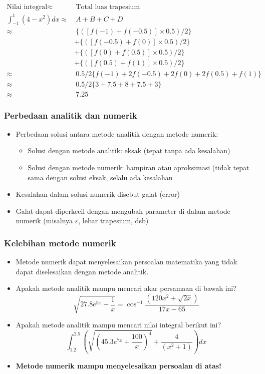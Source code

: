 \documentclass[pdflatex,compress,mathserif]{beamer}
\begin{document}
\begin{frame}
	\begin{align*}
		\text{Nilai integral} \approx&~ \text{Total luas trapesium} \\
		\int_{-1}^{1} (4-x^2) dx  \approx&~  A + B + C + D \\
		\approx&~ \{([ f(-1) + f(-0.5) ] \times 0.5) / 2 \} \\
		&+ \{([ f(-0.5) + f(0) ] \times 0.5) / 2 \} \\
		&+ \{([ f(0) + f(0.5) ] \times 0.5) / 2 \} \\
		&+ \{([ f(0.5) + f(1) ] \times 0.5) / 2 \} \\
		\approx&~ 0.5/2 \{ f(-1) + 2f(-0.5) + 2f(0) + 2f(0.5) + f(1) \} \\
		\approx&~ 0.5/2 \{ 3 + 7.5 + 8 + 7.5 + 3 \} \\
		\approx&~ 7.25
	\end{align*}
\end{frame}

\begin{frame}
	\frametitle{Perbedaan analitik dan numerik}
	\begin{itemize}
		\item Perbedaan solusi antara metode analitik dengan metode numerik:
		\begin{itemize}
			\item Solusi dengan metode analitik: eksak (tepat tanpa ada kesalahan)
			\item Solusi dengan metode numerik: hampiran atau aproksimasi (tidak tepat sama dengan solusi eksak, selalu ada kesalahan
		\end{itemize}
		\item Kesalahan dalam solusi numerik disebut galat (error)
		\item Galat dapat diperkecil dengan mengubah parameter di dalam metode numerik (misalnya $\varepsilon$, lebar trapesium, dsb)
	\end{itemize}
\end{frame}

\begin{frame}
	\frametitle{Kelebihan metode numerik}
	\begin{itemize}
		\item Metode numerik dapat menyelesaikan persoalan matematika yang tidak dapat diselesaikan dengan metode analitik.
		\item Apakah metode analitik mampu mencari akar persamaan di bawah ini?
		\[ \sqrt{27.8e^{5x} - \frac{1}{x}} = \cos^{-1}\frac{(120x^2 + \sqrt{2x})}{17x-65}\]
		\item Apakah metode analitik mampu mencari nilai integral berikut ini?
		\[ \int_{1.2}^{2.5} \left( \sqrt{\left(45.3e^{7x}+\frac{100}{x}\right)^4} + \frac{4}{(x^2 + 1)} \right) dx \]
		\item \textbf{Metode numerik mampu menyelesaikan persoalan di atas! }
	\end{itemize}
\end{frame}
\end{document}
